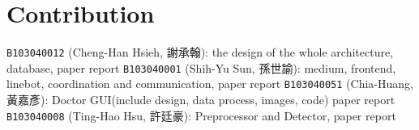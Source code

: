 \documentclass{article}
\begin{document}
\section{Contribution}
\label{sec:contribution}

\texttt{B103040012} (Cheng-Han Hsieh, 謝承翰): the design of the whole architecture, database, paper report
\texttt{B103040001} (Shih-Yu Sun, 孫世諭): medium, frontend, linebot, coordination and communication, paper report
\texttt{B103040051} (Chia-Huang, 黃嘉彥): Doctor GUI(include design, data process, images, code) paper report
\texttt{B103040008} (Ting-Hao Hsu, 許廷豪): Preprocessor and Detector, paper report
\end{document}
